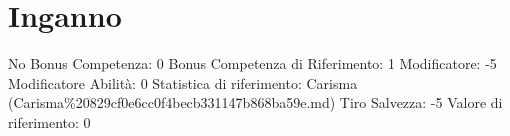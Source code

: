 \section{Inganno}\label{inganno}

\begin{description}
\tightlist
\item[Tags: ABI]
No Bonus Competenza: 0 Bonus Competenza di Riferimento: 1 Modificatore:
-5 Modificatore Abilità: 0 Statistica di riferimento: Carisma
(Carisma\%20829cf0e6cc0f4becb331147b868ba59e.md) Tiro Salvezza: -5
Valore di riferimento: 0
\end{description}
